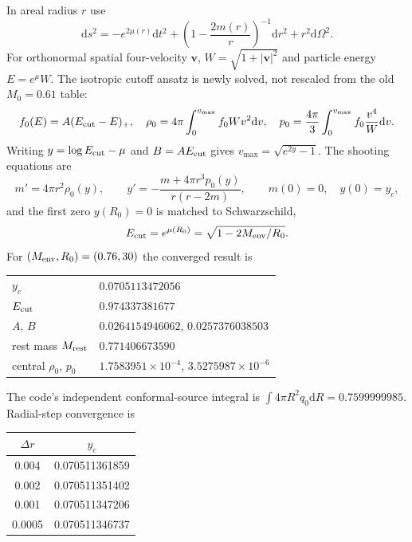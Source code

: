 \documentclass[11pt]{article}
\newcommand{\dd}{\mathrm{d}}
\begin{document}
In areal radius $r$ use
\begin{equation}
 \dd s^2=-e^{2\mu(r)}\dd t^2+\left(1-\frac{2m(r)}r\right)^{-1}\dd r^2+r^2\dd\Omega^2.
\end{equation}
For orthonormal spatial four-velocity $\bm v$, $W=\sqrt{1+|\bm v|^2}$ and particle
energy $E=e^\mu W$.  The isotropic cutoff ansatz is newly solved, not rescaled from the
old $M_0=0.61$ table:
\begin{equation}
 f_0(E)=A(E_{\rm cut}-E)_+,
 \quad \rho_0=4\pi\int_0^{v_{\max}}f_0Wv^2\dd v,
 \quad p_0=\frac{4\pi}{3}\int_0^{v_{\max}}f_0\frac{v^4}{W}\dd v .
\end{equation}
Writing $y=\log E_{\rm cut}-\mu$ and $B=AE_{\rm cut}$ gives
$v_{\max}=\sqrt{e^{2y}-1}$.  The shooting equations are
\begin{equation}
 m'=4\pi r^2\rho_0(y),\qquad
 y'=-\frac{m+4\pi r^3p_0(y)}{r(r-2m)},\qquad m(0)=0,\quad y(0)=y_c,
\end{equation}
and the first zero $y(R_0)=0$ is matched to Schwarzschild,
\begin{equation}
 E_{\rm cut}=e^{\mu(R_0)}=\sqrt{1-2M_{\rm env}/R_0}.
\end{equation}
For $(M_{\rm env},R_0)=(0.76,30)$ the converged result is
\begin{center}
\begin{tabular}{@{}ll@{}}
\toprule
$y_c$ & $0.0705113472056$ \\
$E_{\rm cut}$ & $0.974337381677$ \\
$A$, $B$ & $0.0264154946062$, $0.0257376038503$ \\
rest mass $M_{\rm rest}$ & $0.771406673590$ \\
central $\rho_0$, $p_0$ & $1.7583951\times10^{-4}$, $3.5275987\times10^{-6}$ \\
\bottomrule
\end{tabular}
\end{center}
The code's independent conformal-source integral is
$\int4\pi R^2q_0\dd R=0.7599999985$.  Radial-step convergence is
\begin{center}
\begin{tabular}{@{}cc@{}}
\toprule
$\Delta r$ & $y_c$ \\
\midrule
0.004 & 0.070511361859 \\
0.002 & 0.070511351402 \\
0.001 & 0.070511347206 \\
0.0005 & 0.070511346737 \\
\bottomrule
\end{tabular}
\end{center}
\end{document}

